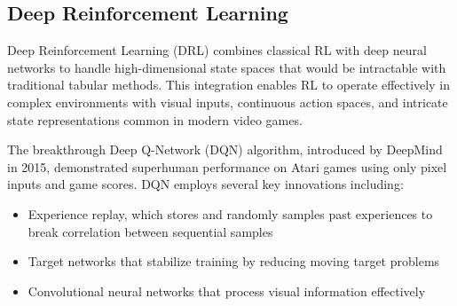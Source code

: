 \subsection{Deep Reinforcement Learning}

Deep Reinforcement Learning (DRL) combines classical RL with deep neural networks to handle high-dimensional state spaces that would be intractable with traditional tabular methods. 
This integration enables RL to operate effectively in complex environments with visual inputs, continuous action spaces, and intricate state representations common in modern video games.

The breakthrough Deep Q-Network (DQN) algorithm, introduced by DeepMind in 2015, demonstrated superhuman performance on Atari games using only pixel inputs and game scores. DQN employs several key innovations including:
\begin{itemize}
    \item Experience replay, which stores and randomly samples past experiences to break correlation between sequential samples
    \item Target networks that stabilize training by reducing moving target problems
    \item Convolutional neural networks that process visual information effectively
\end{itemize}
